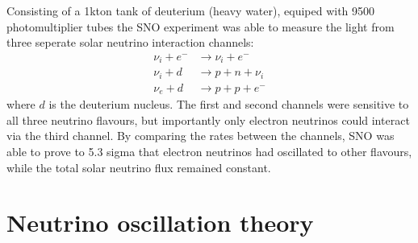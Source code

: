 Consisting of a 1kton tank of deuterium (heavy water), equiped with 9500 photomultiplier tubes the
SNO experiment was able to measure the light from three seperate solar neutrino interaction
channels:
\begin{align} %
    \nu_{i}+e^{-} & \rightarrow \nu_{i}+e^{-} \\
    \nu_{i}+d     & \rightarrow p+n+\nu_{i}   \\
    \nu_{e}+d     & \rightarrow p+p+e^{-}
\end{align} %
where $d$ is the deuterium nucleus. The first and second channels were sensitive to all three
neutrino flavours, but importantly only electron neutrinos could interact via the third channel.
By comparing the rates between the channels, SNO was able to prove to 5.3 sigma that electron
neutrinos had oscillated to other flavours, while the total solar neutrino flux remained constant.

\section{Neutrino oscillation theory}
\label{sec:theory_theory}

